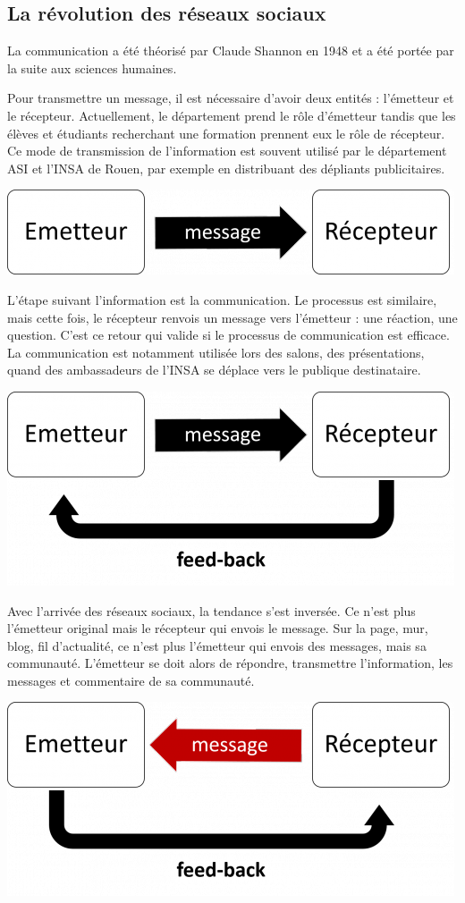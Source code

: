 \subsection{La révolution des réseaux sociaux}
La communication a été théorisé par Claude Shannon en 1948 et a été portée par la suite aux sciences humaines.

Pour transmettre un message, il est nécessaire d'avoir deux entités : l'émetteur et le récepteur. Actuellement, le département prend le rôle d'émetteur tandis que les élèves et étudiants recherchant une formation prennent eux le rôle de récepteur. Ce mode de transmission de l'information est souvent utilisé par le département ASI et l'INSA de Rouen, par exemple en distribuant des dépliants publicitaires.

\begin{center}
\includegraphics[scale=0.5]{./image/information.png}
\end{center}

L'étape suivant l'information est la communication. Le processus est similaire, mais cette fois, le récepteur renvois un message vers l'émetteur : une réaction, une question. C'est ce retour qui valide si le processus de communication est efficace. La communication est notamment utilisée lors des salons, des présentations, quand des ambassadeurs de l'INSA se déplace vers le publique destinataire.

\begin{center}
\includegraphics[scale=0.5]{./image/communication.png}
\end{center}

Avec l'arrivée des réseaux sociaux, la tendance s'est inversée. Ce n'est plus l'émetteur original mais le récepteur qui envois le message. Sur la page, mur, blog, fil d'actualité, ce n'est plus l'émetteur qui envois des messages, mais sa communauté. L'émetteur se doit alors de répondre, transmettre l'information, les messages et commentaire de sa communauté.

\begin{center}
\includegraphics[scale=0.5]{./image/communication_digitale.png}
\end{center}